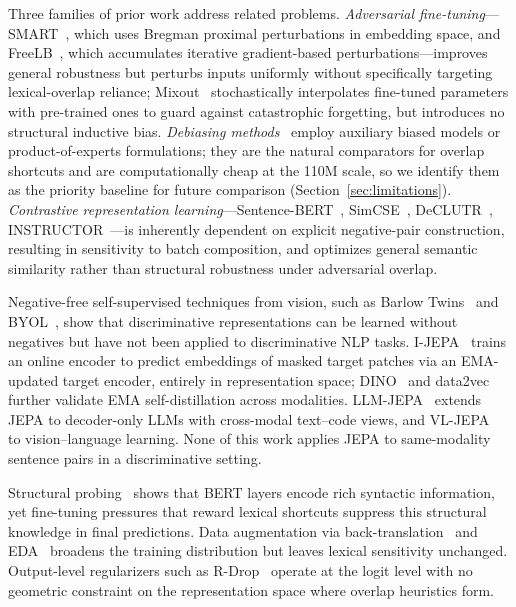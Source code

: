 \documentclass[sigconf]{acmart}
\begin{document}
Three families of prior work address related problems. \emph{Adversarial fine-tuning}---SMART~\cite{jiang2020smart}, which uses Bregman proximal perturbations in embedding space, and FreeLB~\cite{zhu2020freelb}, which accumulates iterative gradient-based perturbations---improves general robustness but perturbs inputs uniformly without specifically targeting lexical-overlap reliance; Mixout~\cite{lee2020mixout} stochastically interpolates fine-tuned parameters with pre-trained ones to guard against catastrophic forgetting, but introduces no structural inductive bias. \emph{Debiasing methods}~\cite{clark2019dont,utama2020towards} employ auxiliary biased models or product-of-experts formulations; they are the natural comparators for overlap shortcuts and are computationally cheap at the 110M scale, so we identify them as the priority baseline for future comparison (Section~\ref{sec:limitations}). \emph{Contrastive representation learning}---Sentence-BERT~\cite{reimers2019sentencebert}, SimCSE~\cite{gao2021simcse}, DeCLUTR~\cite{giorgi2021declutr}, INSTRUCTOR~\cite{su2023instructor}---is inherently dependent on explicit negative-pair construction, resulting in sensitivity to batch composition, and optimizes general semantic similarity rather than structural robustness under adversarial overlap.

Negative-free self-supervised techniques from vision, such as Barlow Twins~\cite{zbontar2021barlow} and BYOL~\cite{grill2020byol}, show that discriminative representations can be learned without negatives but have not been applied to discriminative NLP tasks. I-JEPA~\cite{assran2023ijepa} trains an online encoder to predict embeddings of masked target patches via an EMA-updated target encoder, entirely in representation space; DINO~\cite{caron2021dino} and data2vec~\cite{baevski2022data2vec} further validate EMA self-distillation across modalities. LLM-JEPA~\cite{huang2025llmjepa} extends JEPA to decoder-only LLMs with cross-modal text--code views, and VL-JEPA~\cite{chen2025vljepa} to vision--language learning. None of this work applies JEPA to same-modality sentence pairs in a discriminative setting.

Structural probing~\cite{hewitt2019structural,tenney2019bert} shows that BERT layers encode rich syntactic information, yet fine-tuning pressures that reward lexical shortcuts suppress this structural knowledge in final predictions. Data augmentation via back-translation~\cite{sennrich2016improving} and EDA~\cite{wei2019eda} broadens the training distribution but leaves lexical sensitivity unchanged. Output-level regularizers such as R-Drop~\cite{wu2021rdrop} operate at the logit level with no geometric constraint on the representation space where overlap heuristics form.
\end{document}

